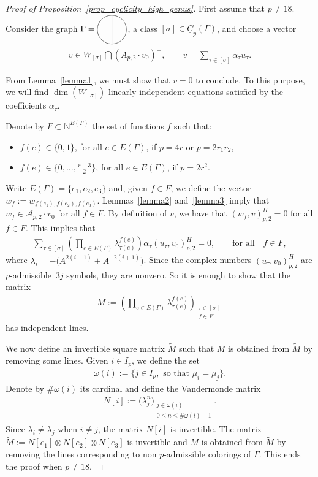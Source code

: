 \documentclass[11pt]{article}
\newcommand{\colu}{\underline{C}_p(\Gamma) }
\newcommand{\Thetagraph}{
\tikz[scale=0.3,baseline=-0.5ex]{
\draw (0,0) circle (2);
\draw (0,2)--(0,-2);
}
}
\newcommand{\muu}[1]{\mu_{#1}}
\numberwithin{equation}{section}
\begin{document}
\begin{proof}[Proof of Proposition~\ref{prop_cyclicity_high_genus}]First assume that $p\neq 18$. Consider the graph $\Gamma=\Thetagraph$, a class $[\sigma]\in \colu$, and choose a vector
\begin{gather*}
 v \in W_{[\sigma]}\bigcap \left( A_{p,2}\cdot v_0\right)^{\bot},\qquad v = \sum_{\tau\in [\sigma]}{\alpha_{\tau}u_{\tau}}.
\end{gather*}

From Lemma~\ref{lemma1}, we must show that $v=0$ to conclude. To this purpose, we will find $\dim \left(W_{[\sigma]}\right)$ linearly independent equations satisfied by the coefficients $\alpha_{\tau}$.

Denote by $F\subset \mathbb{N}^{E(\Gamma)}$ the set of functions $f$ such that:
\begin{itemize}\itemsep=0pt
\item $f(e) \in \{0,1\}$, for all $e\in E(\Gamma)$, if $p=4r$ or $p=2r_1r_2$,
\item $f(e) \in \big\{ 0, \ldots, \frac{r-3}{2} \big\}$, for all $e \in E(\Gamma)$, if $p=2r^2$.
\end{itemize}
Write $E(\Gamma)=\{e_1, e_2, e_3\}$ and, given $f\in F$, we define the vector $w_f:= w_{f(e_1), f(e_2), f(e_3)}$. Lemmas~\ref{lemma2} and~\ref{lemma3} imply that $w_f\in \mathcal{A}_{p,2}\cdot v_0$ for all $f\in F$. By definition of $v$, we have that $(w_f, v)_{p,2}^H = 0$ for all $f\in F$. This implies that
\begin{gather*}
 \sum_{\tau\in [\sigma]}{\left( \prod_{e\in E(\Gamma)}{\lambda_{\tau(e)}^{f(e)}}\right) \alpha_{\tau} \left( u_{\tau}, v_0 \right)_{p,2}^H } =0, \qquad \text{for all} \quad f\in F,
\end{gather*}
where $\lambda_i = -\big(A^{2(i+1)}+A^{-2(i+1)}\big)$. Since the complex numbers $( u_{\tau}, v_0)_{p,2}^H$ are $p$-admissible~$3j$ symbols, they are nonzero. So it is enough to show that the matrix
\begin{gather*} M := \left(\prod_{e\in E(\Gamma)}{\lambda_{\tau(e)}^{f(e)}}\right)_{\substack{\tau\in[\sigma] \\ f\in F}} \end{gather*}
has independent lines.

We now define an invertible square matrix $\widetilde{M}$ such that $M$ is obtained from $\widetilde{M}$ by removing some lines. Given $i\in I_p$, we define the set
\begin{gather*} \omega(i) := \big\{ j\in I_p, \mbox{ so that }\muu{i}=\muu{j} \big\}.\end{gather*}
Denote by $\# \omega(i)$ its cardinal and define the Vandermonde matrix
\begin{gather*} N[i] := \big( \lambda_j^n \big) _{\substack{ j \in \omega(i)\\ 0\leq n \leq \# \omega(i) -1 }}.\end{gather*}
Since $\lambda_i\neq \lambda_j$ when $i\neq j $, the matrix $N[i]$ is invertible. The matrix $ \widetilde{M} := N[e_1]\otimes N[e_2] \otimes N[e_3]$ is invertible and $M$ is obtained from $\widetilde{M}$ by removing the lines corresponding to non $p$-admissible colorings of $\Gamma$. This ends the proof when $p\neq 18$.


\end{proof}
\end{document}
